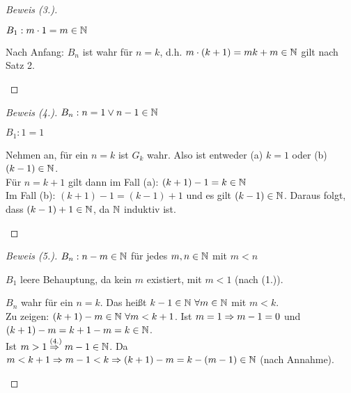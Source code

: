 \begin{satz}
\begin{proof}[Beweis (3.)]
\begin{induktionsanfang}
            $B_1: m\cdot 1=m \in \mathbb{N}$
        \end{induktionsanfang}
        \begin{induktionsschritt}
            Nach Anfang: $B_n$ ist wahr für $n=k$, d.h. $m\cdot(k+1) = mk + m \in\mathbb{N}$ gilt nach Satz 2.\qedhere
        \end{induktionsschritt}
    \end{proof}
    \begin{proof}[Beweis (4.)]
        $B_n: n= 1 \lor n-1\in\mathbb{N}$\\
        \begin{induktionsanfang}
            $B_1: 1=1$
        \end{induktionsanfang}
        \begin{induktionsschritt}
            Nehmen an, für ein $n=k$ ist $G_k$ wahr. Also ist entweder (a) $k=1$ oder (b) $(k-1)\in\mathbb{N}$.\\
            Für $n=k+1$ gilt dann im Fall (a): $(k+1)-1 = k\in\mathbb{N}$\\
            Im Fall (b): $(k+1)-1 = (k-1)+1$ und es gilt $(k-1)\in\mathbb{N}$. Daraus folgt, dass $(k-1)+1\in\mathbb{N}$, da $\mathbb{N}$ induktiv ist.\qedhere
        \end{induktionsschritt}
    \end{proof}
    \begin{proof}[Beweis (5.)]
        $B_n: n-m\in\mathbb{N}$ für jedes $m,n\in\mathbb{N}$ mit $m<n$\\
        \begin{induktionsanfang}
            $B_1$ leere Behauptung, da kein $m$ existiert, mit $m<1$ (nach (1.)).
        \end{induktionsanfang}
        \begin{induktionsschritt}
            $B_n$ wahr für ein $n=k$. Das heißt $k-1\in\mathbb{N}~\forall m\in\mathbb{N}$ mit $m<k$.\\
            Zu zeigen: $(k+1)-m\in\mathbb{N}~\forall m<k+1$. Ist $m=1\Rightarrow{} m-1 = 0$ und $(k+1)-m = k+1-m=k\in\mathbb{N}$.\\
            Ist $m>1 \overset{\text{(4.)}}{\Rightarrow{}} m-1\in\mathbb{N}$. Da $m<k+1 \Rightarrow{} m-1<k \Rightarrow{} (k+1)-m = k-(m-1)\in\mathbb{N}$ (nach Annahme).\qedhere
        \end{induktionsschritt}
    \end{proof}
\end{satz}

